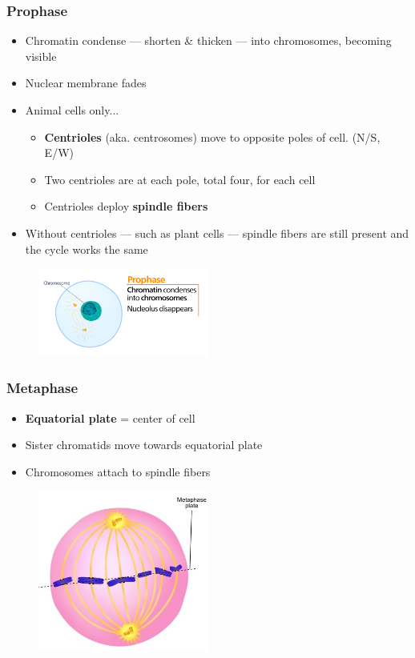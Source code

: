 \documentclass[a4paper,12pt]{article}
\begin{document}
\subsubsection{Prophase}
\begin{itemize}
    \item{Chromatin condense --- shorten \& thicken --- into chromosomes, becoming visible}
    \item{Nuclear membrane fades}
    \item{
            Animal cells only...
            \begin{itemize}
                \item{\textbf{Centrioles} (aka. centrosomes) move to opposite poles of cell. (N/S, E/W)}
                \item{Two centrioles are at each pole, total four, for each cell}
                \item{Centrioles deploy \textbf{spindle fibers}}
            \end{itemize}
        }
    \item{Without centrioles --- such as plant cells --- spindle fibers are still present and the cycle works the same}
\end{itemize}

\begin{figure}[H]
    \centering
    \includegraphics[width=0.5\textwidth]{prophase}
\end{figure}

\subsubsection{Metaphase}
\begin{itemize}
    \item{\textbf{Equatorial plate} = center of cell}
    \item{Sister chromatids move towards equatorial plate}
    \item{Chromosomes attach to spindle fibers}
\end{itemize}

\begin{figure}[H]
    \centering
    \includegraphics[width=0.5\textwidth]{metaphase}
\end{figure}
\end{document}
